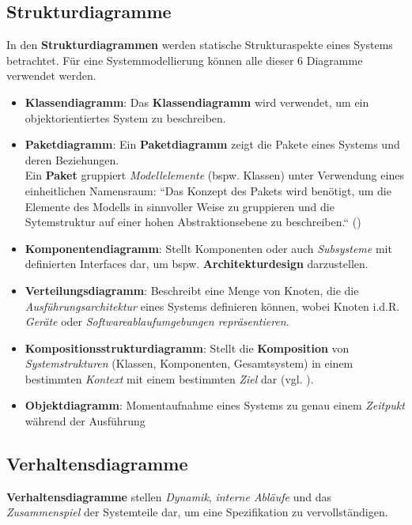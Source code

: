\subsection{Strukturdiagramme}
In den \textbf{Strukturdiagrammen} werden statische Strukturaspekte eines Systems betrachtet.
Für eine Systemmodellierung können alle dieser 6 Diagramme verwendet werden.

\begin{itemize}
    \item \textbf{Klassendiagramm}: Das \textbf{Klassendiagramm} wird verwendet, um ein objektorientiertes System zu beschreiben.
    \item \textbf{Paketdiagramm}: Ein \textbf{Paketdiagramm} zeigt die Pakete eines Systems und deren Beziehungen.\\
    Ein \textbf{Paket} gruppiert \textit{Modellelemente} (bspw. Klassen) unter Verwendung eines einheitlichen Namensraum: ``Das Konzept des Pakets wird benötigt, um die Elemente des Modells in sinnvoller Weise zu gruppieren und die Sytemstruktur auf einer hohen Abstraktionsebene zu beschreiben.`` (\cite[55]{Bal05})
    \item \textbf{Komponentendiagramm}: Stellt Komponenten oder auch \textit{Subsysteme} mit definierten Interfaces dar, um bspw. \textbf{Architekturdesign} darzustellen.
    \item \textbf{Verteilungsdiagramm}: Beschreibt eine Menge von Knoten, die die \textit{Ausführungsarchitektur} eines Systems definieren können, wobei Knoten i.d.R. \textit{Geräte} oder \textit{Softwareablaufumgebungen repräsentieren}.
    \item \textbf{Kompositionsstrukturdiagramm}: Stellt die \textbf{Komposition} von \textit{Systemstrukturen} (Klassen, Komponenten, Gesamtsystem) in einem bestimmten \textit{Kontext} mit einem bestimmten \textit{Ziel} dar (vgl. \cite[9]{Buh09}).
    \item \textbf{Objektdiagramm}: Momentaufnahme eines Systems zu genau einem \textit{Zeitpukt} während der Ausführung
\end{itemize}


\subsection{Verhaltensdiagramme}
\textbf{Verhaltensdiagramme} stellen \textit{Dynamik}, \textit{interne Abläufe} und das \textit{Zusammenspiel} der Systemteile dar, um eine Spezifikation zu vervollständigen.

